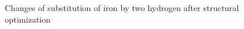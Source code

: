 \begin{figure}[h]
\begin{minipage}[h]{0.49\linewidth}
\end{minipage}
\hfill
\begin{minipage}[h]{0.49\linewidth}
\end{minipage}
\caption{Changes of substitution of iron by two hydrogen after structural optimization}
\label{ris:Fe2H}
\end{figure}

